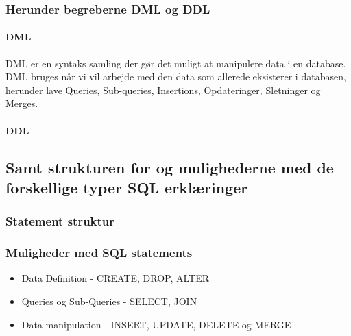 \subsubsection{Herunder begreberne DML og DDL}

\paragraph{DML}
DML er en syntaks samling der gør det muligt at manipulere data i en database.
DML bruges når vi vil arbejde med den data som allerede eksisterer i databasen, herunder lave Queries, Sub-queries, Insertions, Opdateringer, Sletninger og Merges.



\paragraph{DDL}

\subsection{Samt strukturen for og mulighederne med de forskellige typer SQL erklæringer}

\subsubsection{Statement struktur}

\subsubsection{Muligheder med SQL statements}

\begin{itemize}
	\item Data Definition - CREATE, DROP, ALTER
	\item Queries og Sub-Queries - SELECT, JOIN
	\item Data manipulation - INSERT, UPDATE, DELETE og MERGE
\end{itemize}